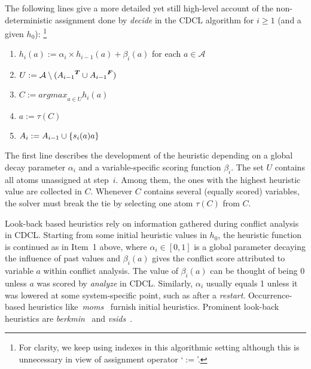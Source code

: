 The following lines give a more detailed yet still high-level account of the non-deterministic assignment done by
\emph{decide} in the CDCL algorithm for $i\geq 1$ (and a given $h_0$):%
\footnote{\label{fn:ass}For clarity, we keep using indexes in this algorithmic setting although this is
  unnecessary in view of assignment operator `$:=$'.}
\begin{enumerate}\itemindent 10pt
\item $h_i(a) := \alpha_i\times h_{i-1}(a) + \beta_i(a)$ \hfill for each $a\in\mathcal{A}\qquad$
\item $U:=\mathcal{A}\setminus ({A_{i-1}}^{\boldsymbol{T}}\cup{\ensuremath{A}_{i-1}}^{\boldsymbol{F}})$
\item $C:= \textit{argmax}_{a\in U}h_i(a)$
\item $a:= \tau(C)$
\item $A_i := A_{i-1}\cup\{s_i(a)a\}$
\end{enumerate}
The first line describes the development of the heuristic depending on a global decay parameter
$\alpha_i$ and a variable-specific scoring function $\beta_i$.
The set $U$ contains all atoms unassigned at step~$i$.
Among them, the ones with the highest heuristic value are collected in $C$.
Whenever $C$ contains several (equally scored) variables,
the solver must break the tie by selecting one atom $\tau(C)$ from $C$.

Look-back based heuristics rely on information gathered during conflict analysis in CDCL.
Starting from some initial heuristic values in $h_0$,
the heuristic function is continued as in Item~1 above,
where
$\alpha_i\in{[0,1]}$ is a global parameter decaying the influence of past values
and
$\beta_i(a)$ gives the conflict score attributed to variable $a$ within conflict analysis.
The value of $\beta_i(a)$ can be thought of being 0 unless $a$ was scored by \textit{analyze} in CDCL.
Similarly, $\alpha_i$ usually equals 1 unless it was lowered at some system-specific point, 
such as after a \emph{restart}.
%
Occurrence-based heuristics like~\textit{moms}~\cite{pretolani96a} furnish initial heuristics.
%
Prominent look-back heuristics are
\textit{berkmin}~\cite{golnov02a}
and
\textit{vsids}~\cite{momazhzhma01a}.

